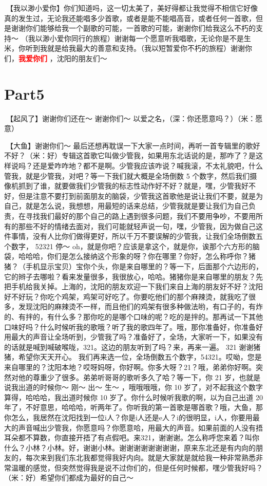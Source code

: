 \documentclass[
]{book}
\begin{document}
🎵【我以渺小爱你】你们知道吗，这一切太美了，美好得都让我觉得不相信它好像真的发生过，无论我还能唱多少首歌，或者是能不能唱高音，或者任何一首歌，但是谢谢你们能够给我一个副歌的可能，一首歌的可能，谢谢你们给我这么不朽的支持～ （我以渺小爱你同行的旅程）谢谢每一个愿意听我唱歌，无论你是不是生米，你听到我就是给我最大的善意和支持。（我以短暂爱你不朽的旅程）谢谢你们，\textbf{\textcolor{red}{我爱你们} }，沈阳的朋友们～

\section{Part5}\label{shenyang-20240907-part5}

🎵【起风了】谢谢你们还在～ 谢谢你们～ 以爱之名，（深：你还愿意吗？）（米：愿意）

🎵【大鱼】谢谢你们～
最后还想再耽误一下大家一点时间，再听一首专辑里的歌好不好？（米：好）专辑这首歌它叫做少管我，如果用东北话说的是，那咋了？是这样说吗？还是爱咋咋地？都不是啊。少管我应该咋说？喊我滚，不太礼貌吧，什么管我，就是少管我，对吧？等一下我们就大概是全场倒数 5 个数字，然后我们摄像机抓到了谁，就要做我们少管我的标志性动作好不好？就是，嘿，少管我好不好，但是注意不要打到前面朋友的脑袋，少管我这首歌他是说让我们不要，就是为自己，就是怎么说，我想想，用最短的话来总结，少管我就是要让我们为自己负责，在寻找我们最好的那个自己的路上遇到很多问题，我们不要用争吵，不要用所有的那些不好的情绪去面对，我们可能就轻声说一句，嘿，少管我，因为做自己这件事情，没有人比你们做得更好，所以千万不要误解的少管我，让我们全场倒数五个数字， 52321 停～ oh，就是你吧？应该是拿这个，就是你，诶那个六方形的脑袋，哈哈哈，你们是怎么接纳这个形象的呀？你在哪里？你好，怎么称呼你？猪猪？（手机显示宝贝）宝你个头，你是来自哪里的？等一下，后面那个六边形的，它的辫子去哪啦？看来发量很多，我很放心，哈哈。猪猪你是来自哪里的朋友？先把手机给我关掉。上海的，沈阳的朋友欢迎一下我们来自上海的朋友好不好？沈阳好不好玩？你吃个鸡架，鸡架可好吃了。你要吃他们的那个麻辣烫，就我吃了很多，发现沈阳的麻辣烫不一样，而且他们的鸡架有很多种做法哟，有口子的，有炸的、有拌的，有什么多？那你吃的是哪个口味的呢？吃的是拌的。那再试一下其他口味好吗？什么时候听我的歌哦？听了我的歌四年了。哦，那你准备好，你准备好用最大的声音让全场听到，少管我了吗？准备好了，全场，大家听一下，如果没有的话就是喊到喊破喉咙，321。这边的朋友听到了吗？来，再来一遍。 321 谢谢猪猪，希望你天天开心。
我们再来选一位，全场倒数五个数字，54321。哎呦，您是来自哪里的？沈阳本地？哎呀妈呀，你好啊。你多大呀？21？哦，弟弟你好啊。突然对他的尊重少了很多。弟弟听哥哥的歌听多久了哈？等一下，你 21 岁，也就是说我出道的时候你～ 刚～ 出～ 生～ ，哦哦哦哦，你 10 岁了，对不起我这个数字算得，哈哈哈，我出道时候你 10 岁了。你什么时候听我歌的啊，以为自己出道 20 年了，不好意思，哈哈哈，听两年了。你听我的第一首歌是哪首歌？哦，大鱼，那你怎么，我居然在沈阳找到一位i人？你是i人还是e人？i的很明显，i人，你要用最大的声音喊出少管我，你愿意吗？你愿意哈，用最大的声音。如果前面的人没有捂耳朵都不算数，你直接开捂了有点假吧。来321，谢谢谢。怎么称呼您来着？叫你什么？小林？小林。好，谢谢小林。谢谢谢谢谢谢谢谢，原来东北还是有内向的朋友的，每次来到我们东北我都觉得我好内向。就是大家就是就给我一种非常熟悉非常温暖的感觉，但突然觉得我是说不过你们的，但是任何时候都，嘿少管我好吗？（米：好）希望你们都成为最好的自己～
\end{document}
